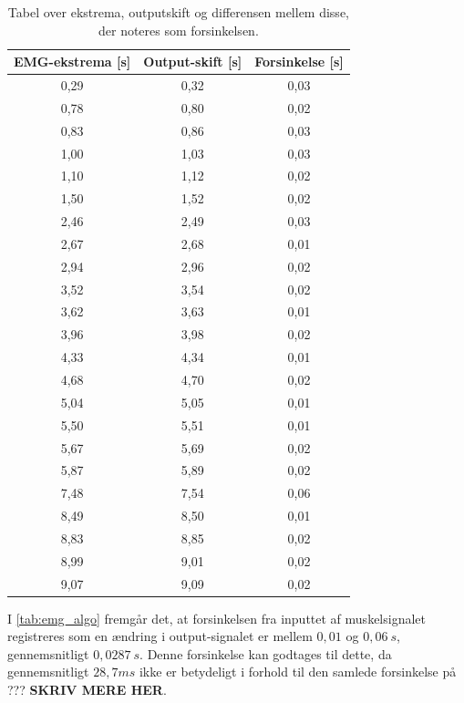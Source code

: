 \begin{table}[H]
\centering
\begin{tabular}{|c|c|c|}
\hline 
\textbf{EMG-ekstrema [s]} & \textbf{Output-skift [s]} & \textbf{Forsinkelse [s]}\\ 
\hline 
0,29 & 0,32 & 0,03\\ 
\hline 
0,78 & 0,80 & 0,02\\ 
\hline 
0,83 & 0,86 & 0,03\\ 
\hline 
1,00 & 1,03 & 0,03\\ 
\hline 
1,10 & 1,12 & 0,02\\ 
\hline 
1,50 & 1,52 & 0,02\\ 
\hline 
2,46 & 2,49 & 0,03\\ 
\hline 
2,67 & 2,68 & 0,01\\ 
\hline 
2,94 & 2,96 & 0,02\\ 
\hline 
3,52 & 3,54 & 0,02\\ 
\hline 
3,62 & 3,63 & 0,01\\ 
\hline 
3,96 & 3,98 & 0,02\\ 
\hline 
4,33 & 4,34 & 0,01\\ 
\hline 
4,68 & 4,70 & 0,02\\ 
\hline 
5,04 & 5,05 & 0,01\\ 
\hline 
5,50 & 5,51 & 0,01\\ 
\hline 
5,67 & 5,69 & 0,02\\ 
\hline 
5,87 & 5,89 & 0,02\\ 
\hline 
7,48 & 7,54 & 0,06\\ 
\hline 
8,49 & 8,50 & 0,01\\ 
\hline 
8,83 & 8,85 & 0,02\\ 
\hline 
8,99 & 9,01 & 0,02\\ 
\hline 
9,07 & 9,09 & 0,02\\ 
\hline 
\end{tabular} 
\label{tab:emg_algo}
\caption{Tabel over ekstrema, outputskift og differensen mellem disse, der noteres som forsinkelsen.}
\end{table}

\noindent
I \autoref{tab:emg_algo} fremgår det, at forsinkelsen fra inputtet af muskelsignalet registreres som en ændring i output-signalet er mellem $0,01$ og $0,06~s$, gennemsnitligt $0,0287~s$. Denne forsinkelse kan godtages til dette, da gennemsnitligt $28,7 ms$ ikke er betydeligt i forhold til den samlede forsinkelse på ??? \textbf{SKRIV MERE HER}.